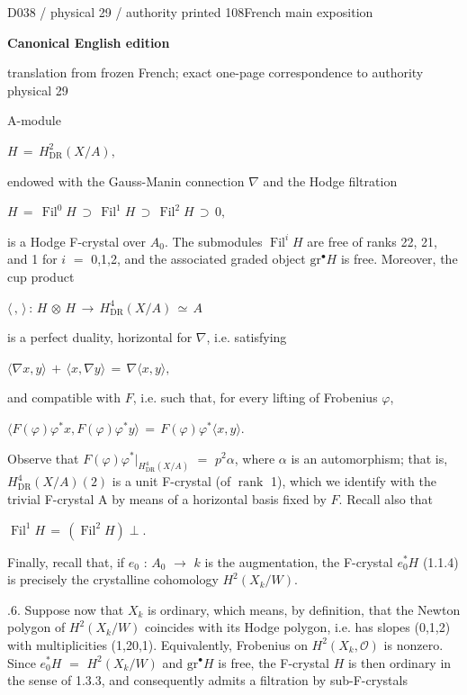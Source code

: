 \documentclass[9pt]{article}
\newcommand{\CanonText}[1]{\par{\fontsize{8.0}{9.35}\selectfont\RaggedRight #1\par}\vspace{2.2pt}}
\newcommand{\CanonDisplay}[1]{\par\vspace{1.2pt}\begin{center}{\fontsize{7.2}{8.4}\selectfont\(\displaystyle #1\)}\end{center}\vspace{1.2pt}}
\newcommand{\LayerTitle}{Canonical English edition}
\begin{document}
\noindent\begin{minipage}[t][\dimexpr\textheight-5pt\relax][t]{\textwidth}
{\sffamily\fontsize{7.3}{8.2}\selectfont\color{Quiet} D038 / physical 29 / authority printed 108\hfill French main exposition}
\par{}\vspace{4.5pt}
{\sffamily\fontsize{10.4}{11.6}\selectfont\bfseries\color{Accent} \LayerTitle}
\par{\sffamily\fontsize{6.7}{7.7}\selectfont\color{Quiet} translation from frozen French; exact one-page correspondence to authority physical 29}
\vspace{5pt}
\CanonText{A-module}
\CanonDisplay{H\,=\,H^{2}_{\mathrm{DR}}(X/A),}
\CanonText{endowed with the Gauss-Manin connection \(\nabla{}\) and the Hodge filtration}
\CanonDisplay{H\,=\,\operatorname{Fil}^{0}H\,\supset{}\,\operatorname{Fil}^{1}H\,\supset{}\,\operatorname{Fil}^{2}H\,\supset{}\,0,}
\CanonText{is a Hodge F-crystal over \(A_{0}\). The submodules \(\operatorname{Fil}^{i}H\) are free of ranks 22, 21, and 1 for \(i\) \(=\) 0,1,2, and the associated graded object \(\text{gr}^\bullet{}H\) is free. Moreover, the cup product}
\CanonDisplay{\langle{}\,,\,\rangle{}\,:\,H\,\otimes{}\,H\,\to{}\,H^{4}_{\mathrm{DR}}(X/A)\,\simeq{}\,A}
\CanonText{is a perfect duality, horizontal for \(\nabla{}\), i.e. satisfying}
\CanonDisplay{\langle{}\nabla{}x,y\rangle{}\,+\,\langle{}x,\nabla{}y\rangle{}\,=\,\nabla{}\langle{}x,y\rangle{},}
\CanonText{and compatible with \(F\), i.e. such that, for every lifting of Frobenius \(\varphi{}\),}
\CanonDisplay{\langle{}F(\varphi{})\varphi{}^{*}x,F(\varphi{})\varphi{}^{*}y\rangle{}\,=\,F(\varphi{})\varphi{}^{*}\langle{}x,y\rangle{}.}
\CanonText{Observe that \(F(\varphi{})\varphi{}^{*}|_{H^{4}_{\mathrm{DR}}(X/A)}\) \(=\) \(p^{2}\alpha{}\), where \(\alpha{}\) is an automorphism; that is, \(H^{4}_{\mathrm{DR}}(X/A)(2)\) is a unit F-crystal (of \(\operatorname{rank}\) 1), which we identify with the trivial F-crystal A by means of a horizontal basis fixed by \(F\). Recall also that}
\CanonDisplay{\operatorname{Fil}^{1}H\,=\,(\operatorname{Fil}^{2}H)\perp{}.}
\CanonText{Finally, recall that, if \(e_{0}\) : \(A_{0}\) \(\to{}\) \(k\) is the augmentation, the F-crystal \(e_{0}^{*}H\) (1.1.4) is precisely the crystalline cohomology \(H^{2}(X_{k}/W)\).}
\CanonText{2.1.6. Suppose now that \(X_{k}\) is ordinary, which means, by definition, that the Newton polygon of \(H^{2}(X_{k}/W)\) coincides with its Hodge polygon, i.e. has slopes (0,1,2) with multiplicities (1,20,1). Equivalently, Frobenius on \(H^{2}(X_{k},\mathcal{O})\) is nonzero. Since \(e_{0}^{*}H\) \(=\) \(H^{2}(X_{k}/W)\) and \(\text{gr}^\bullet{}H\) is free, the F-crystal \(H\) is then ordinary in the sense of 1.3.3, and consequently admits a filtration by sub-F-crystals}

\end{minipage}
\end{document}
